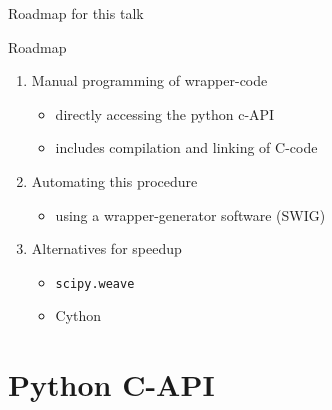 \documentclass[german]{beamer}
\begin{document}
\begin{frame}[fragile]{Roadmap for this talk}

\begin{block}{Roadmap}
  \begin{enumerate}
  \item Manual programming of wrapper-code
    \begin{itemize}
    \item directly accessing the python c-API
    \item includes compilation and linking of C-code
    \end{itemize}
  \item Automating this procedure
    \begin{itemize}
    \item using a wrapper-generator software (SWIG)
    \end{itemize}
  \item Alternatives for speedup
    \begin{itemize}
    \item {\tt scipy.weave}
    \item Cython
    \end{itemize}
  \end{enumerate}
\end{block}

\end{frame}


\section{Python C-API}
\end{document}
